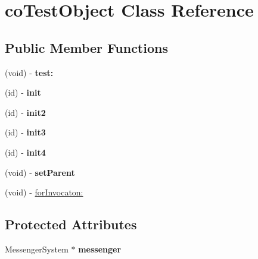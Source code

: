 \hypertarget{interfaceco_test_object}{
\section{coTestObject Class Reference}
\label{interfaceco_test_object}
}
\subsection*{Public Member Functions}
\begin{DoxyCompactItemize}
\item 
\hypertarget{interfaceco_test_object_aeaeb6296cd8136c1a2bf9dd5a3e1e8ba}{
(void) -\/ {\bfseries test:}}
\label{interfaceco_test_object_aeaeb6296cd8136c1a2bf9dd5a3e1e8ba}

\item 
\hypertarget{interfaceco_test_object_ad4df8b647e8d18290730e84db5968dae}{
(id) -\/ {\bfseries init}}
\label{interfaceco_test_object_ad4df8b647e8d18290730e84db5968dae}

\item 
\hypertarget{interfaceco_test_object_af188dbee0d5cd07b40018c7bc6363c5d}{
(id) -\/ {\bfseries init2}}
\label{interfaceco_test_object_af188dbee0d5cd07b40018c7bc6363c5d}

\item 
\hypertarget{interfaceco_test_object_ac15e6d14bffda04cc85c0def9cc56551}{
(id) -\/ {\bfseries init3}}
\label{interfaceco_test_object_ac15e6d14bffda04cc85c0def9cc56551}

\item 
\hypertarget{interfaceco_test_object_a0468c0ab15f7dac98daaf01e54c9b0a8}{
(id) -\/ {\bfseries init4}}
\label{interfaceco_test_object_a0468c0ab15f7dac98daaf01e54c9b0a8}

\item 
\hypertarget{interfaceco_test_object_a0768c26320de873f18add5a45e1728a4}{
(void) -\/ {\bfseries setParent}}
\label{interfaceco_test_object_a0768c26320de873f18add5a45e1728a4}

\item 
(void) -\/ \hyperlink{interfaceco_test_object_a57f01d819188ccb1e0219a40f223d09c}{forInvocaton:}
\end{DoxyCompactItemize}
\subsection*{Protected Attributes}
\begin{DoxyCompactItemize}
\item 
\hypertarget{interfaceco_test_object_af59b3be350971e29fb5c72ffcaa80365}{
MessengerSystem $\ast$ {\bfseries messenger}}
\label{interfaceco_test_object_af59b3be350971e29fb5c72ffcaa80365}

\end{DoxyCompactItemize}


